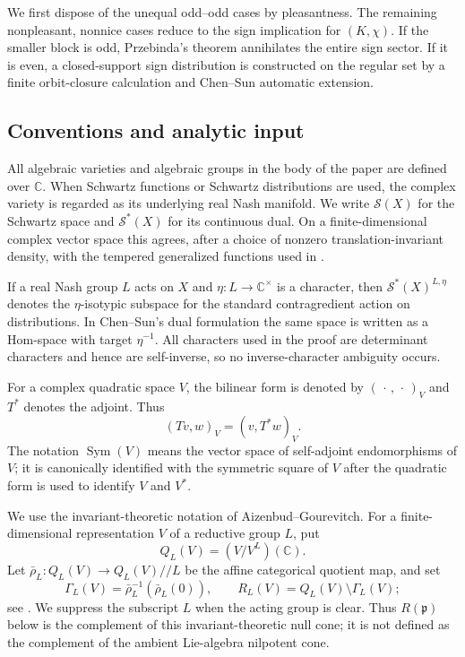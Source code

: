 \documentclass[11pt,reqno]{amsart}
\numberwithin{equation}{section}
\theoremstyle{definition}
\theoremstyle{remark}
\newcommand{\C}{\mathbb C}
\newcommand{\Sym}{\operatorname{Sym}}
\newcommand{\fp}{\mathfrak p}
\newcommand{\cS}{\mathcal S}
\begin{document}
We first dispose of the unequal odd--odd cases by pleasantness.  The
remaining nonpleasant, nonnice cases reduce to the sign implication for
$(K,\chi)$.  If the smaller
block is odd, Przebinda's theorem annihilates the entire sign sector.  If it is
even, a closed-support sign distribution is constructed on the regular set by
a finite orbit-closure calculation and Chen--Sun automatic extension.
\subsection{Conventions and analytic input}\label{spin:sec:conventions}

All algebraic varieties and algebraic groups in the body of the paper are
defined over $\C$.  When Schwartz functions or Schwartz distributions are
used, the complex variety is regarded as its underlying real Nash manifold.
We write $\cS(X)$ for the Schwartz space and $\cS^*(X)$ for its continuous
dual.  On a finite-dimensional complex vector space this agrees, after a
choice of nonzero translation-invariant density, with the tempered generalized
functions used in \cite{JSZ}.

If a real Nash group $L$ acts on $X$ and $\eta:L\to\C^\times$ is a character,
then $\cS^*(X)^{L,\eta}$ denotes the $\eta$-isotypic subspace for the standard
contragredient action on distributions.  In Chen--Sun's dual formulation the
same space is written as a Hom-space with target $\eta^{-1}$.  All characters
used in the proof are determinant characters and hence are self-inverse, so no
inverse-character ambiguity occurs.

For a complex quadratic space $V$, the bilinear form is denoted by
$(\,\cdot\,,\,\cdot\,)_V$ and $T^*$ denotes the adjoint.  Thus
\[
  (Tv,w)_V=(v,T^*w)_V.
\]
The notation $\Sym(V)$ means the vector space of self-adjoint endomorphisms of
$V$; it is canonically identified with the symmetric square of $V$ after the
quadratic form is used to identify $V$ and $V^*$.

We use the invariant-theoretic notation of Aizenbud--Gourevitch.  For a
finite-dimensional representation $V$ of a reductive group $L$, put
\[
  Q_L(V)=(V/V^L)(\C).
\]
Let $\bar\rho_L:Q_L(V)\to Q_L(V)/\!/L$ be the affine categorical quotient
map, and set
\[
  \Gamma_L(V)=\bar\rho_L^{-1}(\bar\rho_L(0)),
  \qquad
  R_L(V)=Q_L(V)\setminus\Gamma_L(V);
\]
see \cite[Notation~2.3.10]{AG09}.  We suppress the subscript $L$ when the
acting group is clear.  Thus $R(\fp)$ below is the complement of this
invariant-theoretic null cone; it is not defined as the complement of the
ambient Lie-algebra nilpotent cone.
\end{document}
